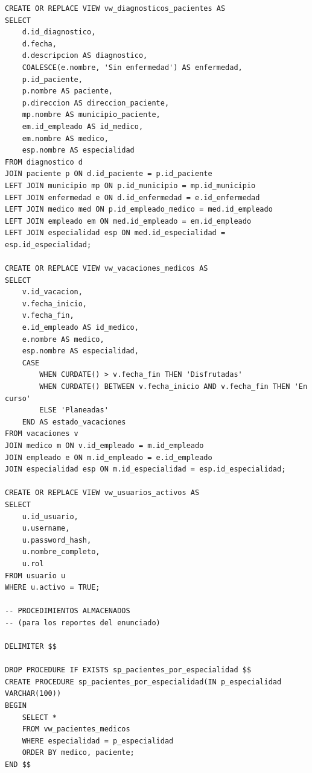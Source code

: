 \documentclass[12pt,a4paper]{article}
\begin{document}
{\begin{verbatim}
CREATE OR REPLACE VIEW vw_diagnosticos_pacientes AS
SELECT
    d.id_diagnostico,
    d.fecha,
    d.descripcion AS diagnostico,
    COALESCE(e.nombre, 'Sin enfermedad') AS enfermedad,
    p.id_paciente,
    p.nombre AS paciente,
    p.direccion AS direccion_paciente,
    mp.nombre AS municipio_paciente,
    em.id_empleado AS id_medico,
    em.nombre AS medico,
    esp.nombre AS especialidad
FROM diagnostico d
JOIN paciente p ON d.id_paciente = p.id_paciente
LEFT JOIN municipio mp ON p.id_municipio = mp.id_municipio
LEFT JOIN enfermedad e ON d.id_enfermedad = e.id_enfermedad
LEFT JOIN medico med ON p.id_empleado_medico = med.id_empleado
LEFT JOIN empleado em ON med.id_empleado = em.id_empleado
LEFT JOIN especialidad esp ON med.id_especialidad = esp.id_especialidad;

CREATE OR REPLACE VIEW vw_vacaciones_medicos AS
SELECT
    v.id_vacacion,
    v.fecha_inicio,
    v.fecha_fin,
    e.id_empleado AS id_medico,
    e.nombre AS medico,
    esp.nombre AS especialidad,
    CASE
        WHEN CURDATE() > v.fecha_fin THEN 'Disfrutadas'
        WHEN CURDATE() BETWEEN v.fecha_inicio AND v.fecha_fin THEN 'En curso'
        ELSE 'Planeadas'
    END AS estado_vacaciones
FROM vacaciones v
JOIN medico m ON v.id_empleado = m.id_empleado
JOIN empleado e ON m.id_empleado = e.id_empleado
JOIN especialidad esp ON m.id_especialidad = esp.id_especialidad;

CREATE OR REPLACE VIEW vw_usuarios_activos AS
SELECT
    u.id_usuario,
    u.username,
    u.password_hash,
    u.nombre_completo,
    u.rol
FROM usuario u
WHERE u.activo = TRUE;

-- PROCEDIMIENTOS ALMACENADOS
-- (para los reportes del enunciado)

DELIMITER $$

DROP PROCEDURE IF EXISTS sp_pacientes_por_especialidad $$
CREATE PROCEDURE sp_pacientes_por_especialidad(IN p_especialidad VARCHAR(100))
BEGIN
    SELECT *
    FROM vw_pacientes_medicos
    WHERE especialidad = p_especialidad
    ORDER BY medico, paciente;
END $$


\end{verbatim}}
\end{document}
